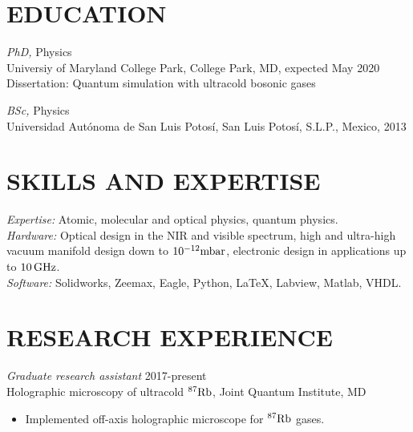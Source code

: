 \documentclass[margin]{res} %
\begin{document}
\begin{resume}


\section{EDUCATION}

{\sl PhD,} Physics \\
Universiy of Maryland College Park, College Park, MD, expected May 2020 \\
Dissertation: Quantum simulation with ultracold bosonic gases

{\sl BSc,} Physics \\
Universidad Aut\'onoma de San Luis Potos\'i, San Luis Potos\'i, S.L.P., Mexico, 2013
 

\section{SKILLS AND EXPERTISE}

{\sl Expertise:}
Atomic, molecular and optical physics, quantum physics.\\
{\sl Hardware:}
Optical design in the NIR and visible spectrum, high and ultra-high vacuum manifold design down to ${10^{-12} {\rm mbar}}$, electronic design in applications up to ${10 \, {\rm GHz}}$.\\
{\sl Software:}
Solidworks, Zeemax, Eagle, Python, \LaTeX, Labview, Matlab, VHDL.

 
\section{RESEARCH EXPERIENCE}

{\sl Graduate research assistant} \hfill 2017-present \\
Holographic microscopy of ultracold ${^{87} {\rm Rb}}$, Joint Quantum Institute, MD
\begin{itemize} \itemsep -2pt
\item Implemented off-axis holographic microscope for ${^{87} {\rm Rb}}$ gases.
\end{itemize} 


\end{resume}
\end{document}
